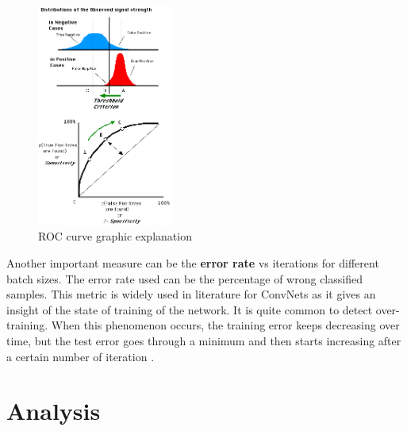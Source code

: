 \documentclass[]{article}
\begin{document}
\begin{figure}[htpb!]
\centering
\includegraphics[width= 0.4\textwidth]{images/ROCfig}
\caption{ROC curve graphic explanation \cite{wikiwand} \label{img:ROC}}
\end{figure}

Another important measure can be the \textbf{error rate} vs iterations for different batch sizes. The error rate used can be the percentage of wrong classified samples. This metric is widely used in literature for ConvNets \cite{Lecun98,Krizhevsky12} as it gives an insight of the state of training of the network. It is quite common to detect over-training. When this phenomenon occurs, the training error keeps decreasing over time, but the test error goes through a minimum and then starts increasing after a certain number of iteration \cite{Lecun98}.

\pagebreak

\section{Analysis}\label{ii.-analysis}
\end{document}
